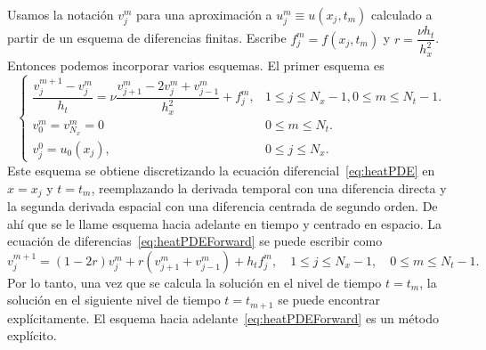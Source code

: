 \begin{frame}
	\frametitle{\insertsection}

	Usamos la notación $v^{m}_{j}$ para una aproximación a
	$u^{m}_{j}\equiv u\left(x_{j},t_{m}\right)$ calculado a partir de
	un esquema de diferencias finitas.
	Escribe $f^{m}_{j}=f\left(x_{j},t_{m}\right)$ y
	$r=\dfrac{\nu h_{t}}{h^{2}_{x}}$.
	Entonces podemos incorporar varios esquemas.
	El primer esquema es
	\begin{equation}\label{eq:heatPDEForward}
		\begin{cases}\displaystyle
			\dfrac{v^{m+1}_{j}-v^{m}_{j}}{h_{t}}=
			\nu
			\dfrac{v^{m}_{j+1}-2v^{m}_{j}+v^{m}_{j-1}}{h^{2}_{x}}+
			f^{m}_{j},                         &
			1\leq j\leq N_{x}-1, 0\leq m\leq N_{t}-1. \\
			v^{m}_{0}=v^{m}_{N_{x}}=0          &
			0\leq m\leq N_{t}.                        \\
			v^{0}_{j}=u_{0}\left(x_{j}\right), &
			0\leq j\leq N_{x}.
		\end{cases}
	\end{equation}
	Este esquema se obtiene discretizando la ecuación
	diferencial~\eqref{eq:heatPDE} en $x=x_{j}$ y $t=t_{m}$,
	reemplazando la derivada temporal con una diferencia directa y la
	segunda derivada espacial con una diferencia centrada de segundo
	orden.
	De ahí que se le llame esquema hacia adelante en tiempo y centrado
	en espacio.
	La ecuación de diferencias~\eqref{eq:heatPDEForward} se puede
	escribir como
	\begin{equation*}
		v^{m+1}_{j}=
		\left(1-2r\right)
		v^{m}_{j}+
		r\left(v^{m}_{j+1}+v^{m}_{j-1}\right)+
		h_{t}f^{m}_{j},\quad
		1\leq j\leq N_{x}-1,\quad 0\leq m\leq N_{t}-1.
	\end{equation*}
	Por lo tanto, una vez que se calcula la solución en el nivel de
	tiempo $t=t_{m}$, la solución en el siguiente nivel de tiempo
	$t=t_{m+1}$ se puede encontrar explícitamente.
	El esquema hacia adelante~\eqref{eq:heatPDEForward} es un método
	explícito.
\end{frame}

